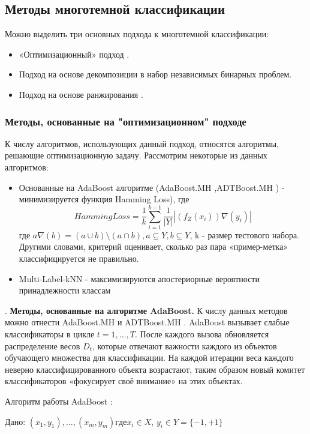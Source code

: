 \documentclass[russian, utf8, emptystyle]{eskdtext}
\begin{document}
\subsection{Методы многотемной классификации}
Можно выделить три основных подхода к многотемной классификации: \cite{dis}
\begin{itemize}
	\item «Оптимизационный» подход \cite{AdaBoost,ADT,mlKNN}.
	\item Подход на основе декомпозиции в набор независимых бинарных проблем. 
	\item Подход на основе ранжирования \cite{rank1,rank2}.
\end{itemize}
	\subsubsection{Методы, основанные на "оптимизационном"  подходе}
К числу алгоритмов, использующих данный подход, относятся алгоритмы, решающие оптимизационную задачу. Рассмотрим некоторые из данных алгоритмов:
\begin{itemize}
	\item Основанные на AdaBoost алгоритме (AdaBoost.MH \cite{AdaBoost},ADTBoost.MH \cite{ADT}) - минимизируется функция Hamming Loss), где $$HammingLoss=\frac{1}{k}\sum_{i=1}^{k-1}\frac{1}{|Y|}|(f_Z(x_i))\nabla(y_i)|$$
	где $a\nabla(b)=(a\cup b) \setminus (a \cap b), a \subseteq Y, b \subseteq Y$, k - размер тестового набора. Другими словами, критерий   оценивает, сколько раз пара «пример-метка» классифицируется не правильно. 
	\item Multi-Label-kNN - \cite{kNN} максимизируются апостериорные вероятности принадлежности классам
\end{itemize}.
{\bf Методы, основанные на алгоритме AdaBoost.} К числу данных методов можно отнести AdaBoost.MH \cite{AdaBoost} и ADTBoost.MH \cite{ADT}.
AdaBoost вызывает слабые классификаторы в цикле  $t = 1,\ldots,T.$ После каждого вызова обновляется распределение весов $D_{t}$, которые отвечают важности каждого из объектов обучающего множества для классификации. На каждой итерации веса каждого неверно классифицированного объекта возрастают, таким образом новый комитет классификаторов «фокусирует своё внимание» на этих объектах.

Алгоритм работы AdaBoost \cite{wikiAdaBoost}:

Дано: $(x_{1},y_{1}),\ldots,(x_{m},y_{m}) где x_{i} \in X,\, y_{i} \in Y = \{-1, +1\}$
\end{document}
